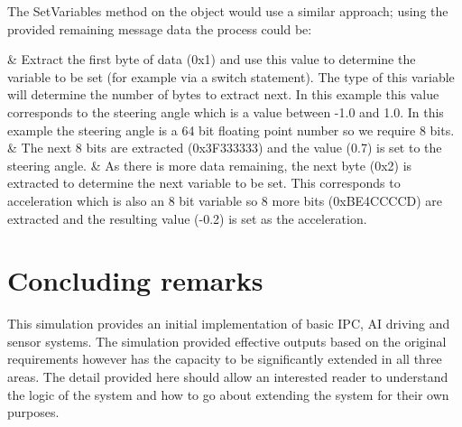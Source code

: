 \documentclass{article}
\begin{document}
The SetVariables method on the object would use a similar approach; using the provided remaining message data the process could be:
\begin{easylist}[itemize]
	& Extract the first byte of data (0x1) and use this value to determine the variable to be set (for example via a switch statement). The type of this variable will determine the number of bytes to extract next. In this example this value corresponds to the steering angle which is a value between -1.0 and 1.0. In this example the steering angle is a 64 bit floating point number so we require 8 bits.
	& The next 8 bits are extracted (0x3F333333) and the value (0.7) is set to the steering angle.
	& As there is more data remaining, the next byte (0x2) is extracted to determine the next variable to be set. This corresponds to acceleration which is also an 8 bit variable so 8 more bits (0xBE4CCCCD) are extracted and the resulting value (-0.2) is set as the acceleration.
\end{easylist}



\section*{Concluding remarks}

This simulation provides an initial implementation of basic IPC, AI driving and sensor systems. The simulation provided effective outputs based on the original requirements however has the capacity to be significantly extended in all three areas. The detail provided here should allow an interested reader to understand the logic of the system and how to go about extending the system for their own purposes.
\end{document}
